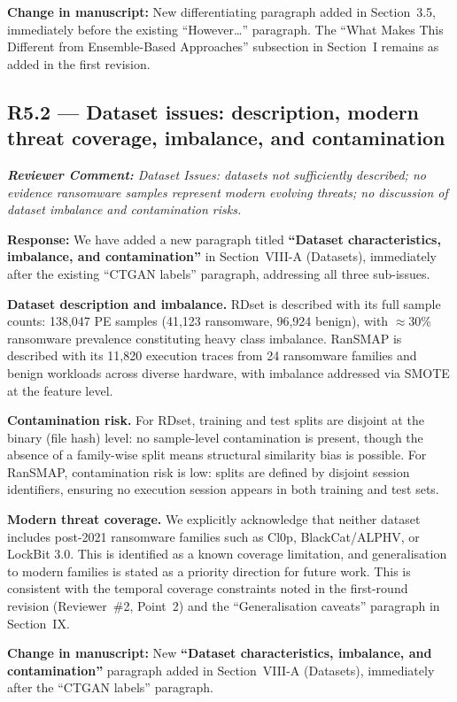 \documentclass[11pt,a4paper]{article}
\newcommand{\RC}[1]{\begin{reviewbox}\textit{\textbf{Reviewer Comment:} #1}\end{reviewbox}}
\newcommand{\RS}[1]{\noindent\textcolor{responsegreen}{\textbf{Response:}} #1\par\medskip}
\newcommand{\CH}[1]{\noindent\textcolor{changebrown}{\textbf{Change in manuscript:}} #1\par\bigskip}
\begin{document}
\CH{New differentiating paragraph added in Section~3.5, immediately before the
existing ``However\ldots'' paragraph. The ``What Makes This Different from
Ensemble-Based Approaches'' subsection in Section~I remains as added in the
first revision.}

\subsection*{R5.2 --- Dataset issues: description, modern threat coverage, imbalance, and contamination}

\RC{Dataset Issues: datasets not sufficiently described; no evidence ransomware
samples represent modern evolving threats; no discussion of dataset imbalance and
contamination risks.}

\RS{We have added a new paragraph titled \textbf{``Dataset characteristics,
imbalance, and contamination''} in Section~VIII-A (Datasets), immediately after
the existing ``CTGAN labels'' paragraph, addressing all three sub-issues.

\textbf{Dataset description and imbalance.}
RDset is described with its full sample counts: 138,047 PE samples (41,123
ransomware, 96,924 benign), with $\approx$30\% ransomware prevalence constituting
heavy class imbalance. RanSMAP is described with its 11,820 execution traces from
24 ransomware families and benign workloads across diverse hardware, with imbalance
addressed via SMOTE at the feature level.

\textbf{Contamination risk.}
For RDset, training and test splits are disjoint at the binary (file hash) level:
no sample-level contamination is present, though the absence of a family-wise split
means structural similarity bias is possible. For RanSMAP, contamination risk is
low: splits are defined by disjoint session identifiers, ensuring no execution
session appears in both training and test sets.

\textbf{Modern threat coverage.}
We explicitly acknowledge that neither dataset includes post-2021 ransomware families
such as Cl0p, BlackCat/ALPHV, or LockBit 3.0. This is identified as a known
coverage limitation, and generalisation to modern families is stated as a priority
direction for future work. This is consistent with the temporal coverage constraints
noted in the first-round revision (Reviewer~\#2, Point~2) and the ``Generalisation
caveats'' paragraph in Section~IX.}

\CH{New \textbf{``Dataset characteristics, imbalance, and contamination''} paragraph
added in Section~VIII-A (Datasets), immediately after the ``CTGAN labels'' paragraph.}
\end{document}
